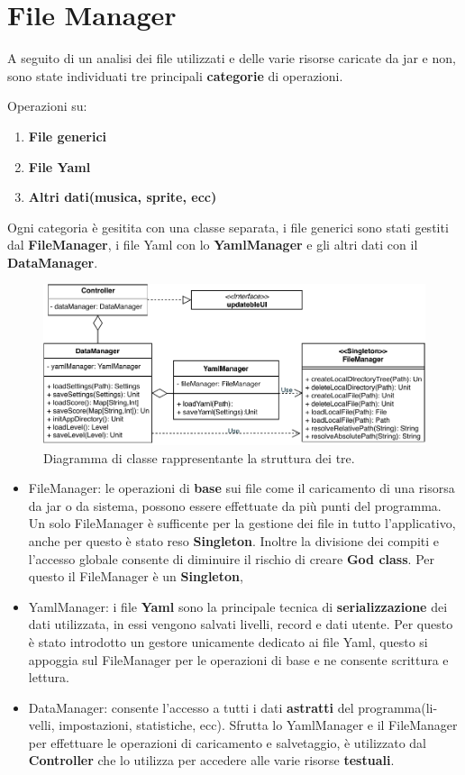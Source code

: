 \section{File Manager}
\label{sec:file_manager_design}
A seguito di un analisi dei file utilizzati e delle varie risorse caricate da jar e non, sono state individuati tre principali \textbf{categorie} di operazioni.

\hfill \break
Operazioni su:
\begin{enumerate}
    \item \textbf{File generici}
    \item \textbf{File Yaml}
    \item \textbf{Altri dati(musica, sprite, ecc)}
\end{enumerate}

Ogni categoria è gesitita con una classe separata, i file generici sono stati gestiti dal \textbf{FileManager}, i file Yaml con lo \textbf{YamlManager} e gli altri dati con il \textbf{DataManager}.


\begin{figure}[H]
	\centering
	\includegraphics[width=0.90\columnwidth]{drawio/fileManager/fileManager.pdf}
	\caption{Diagramma di classe rappresentante la struttura dei tre.}
	\label{fig:FileManager}
\end{figure}

\begin{itemize}
    \item FileManager: le operazioni di \textbf{base} sui file come il caricamento di una risorsa da jar o da sistema, possono essere effettuate da più punti del programma.
    Un solo FileManager è sufficente per la gestione dei file in tutto l'applicativo, anche per questo è stato reso \textbf{Singleton}.
    Inoltre la divisione dei compiti e l'accesso globale consente di diminuire il rischio di creare \textbf{God class}.
    Per questo il FileManager è un \textbf{Singleton}, 
    \item YamlManager: i file \textbf{Yaml} sono la principale tecnica di \textbf{serializzazione} dei dati utilizzata, in essi vengono salvati livelli, record e dati utente.
    Per questo è stato introdotto un gestore unicamente dedicato ai file Yaml, questo si appoggia sul FileManager per le operazioni di base e ne consente
    scrittura e lettura.
    \item DataManager: consente l'accesso a tutti i dati \textbf{astratti} del programma(li-velli, impostazioni, statistiche, ecc).
    Sfrutta lo YamlManager e il FileManager per effettuare le operazioni di caricamento e salvetaggio, è utilizzato dal \textbf{Controller} che lo utilizza per accedere alle varie risorse \textbf{testuali}.
\end{itemize}